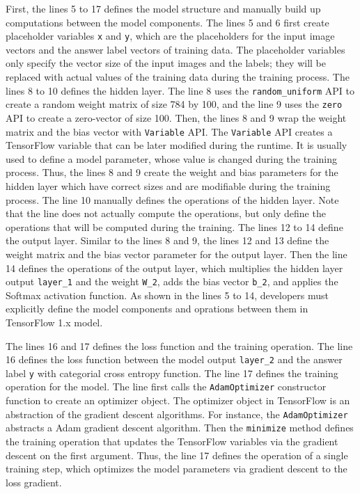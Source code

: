 First, the lines 5 to 17 defines the model structure and manually build up
computations between the model components.
The lines 5 and 6 first create placeholder variables {\tt x} and {\tt y},
which are the placeholders for the input image vectors 
and the answer label vectors of training data.
The placeholder variables only specify the vector size of the input images
and the labels; they will be replaced with actual values of the training
data during the training process. 
The lines 8 to 10 defines the hidden layer.
The line 8 uses the {\tt random\_uniform} API to create 
a random weight matrix of size 784 by 100, 
and the line 9 uses the {\tt zero} API to create a zero-vector of size 100.
Then, the lines 8 and 9 wrap the weight matrix and the bias vector with
{\tt Variable} API.
The {\tt Variable} API creates a TensorFlow variable that can be later modified
during the runtime. It is usually used to define a model 
parameter, whose value is changed during the training process.
Thus, the lines 8 and 9 create the weight and bias parameters for the
hidden layer which have correct sizes and are modifiable during the 
training process.
The line 10 manually defines the operations of the hidden layer. 
Note that the line does not actually compute the operations,
but only define the operations that will be computed during the training.
The lines 12 to 14 define the output layer.
Similar to the lines 8 and 9, the lines 12 and 13 define the weight matrix
and the bias vector parameter for the output layer.
Then the line 14 defines the operations of the output layer,
which multiplies the hidden layer output {\tt layer\_1} and
the weight {\tt W\_2}, adds the bias vector {\tt b\_2}, and applies the
Softmax activation function.
As shown in the lines 5 to 14, developers must explicitly define
the model components and oprations between them in TensorFlow 1.x model.

The lines 16 and 17 defines the loss function and the training operation. 
The line 16 defines the loss function between the model output {\tt layer\_2} 
and the answer label {\tt y} with categorial cross entropy function.
The line 17 defines the training operation for the model.
The line first calls the {\tt AdamOptimizer} constructor
function to create an optimizer object.
The optimizer object in TensorFlow is an abstraction of the gradient
descent algorithms.
For instance, the {\tt AdamOptimizer} abstracts a Adam gradient descent
algorithm. %
Then the {\tt minimize} method defines the training operation that updates the
TensorFlow variables via the gradient descent on the first argument.
Thus, the line 17 defines the operation of a single training step,
which optimizes the model parameters via gradient descent to the loss gradient.

